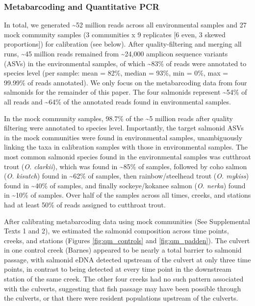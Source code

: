 \documentclass[
]{article}
\begin{document}
\hypertarget{metabarcoding-and-quantitative-pcr}{%
\subsubsection{Metabarcoding and Quantitative
PCR}\label{metabarcoding-and-quantitative-pcr}}

In total, we generated \textasciitilde52 million reads across all
environmental samples and 27 mock community samples (3 communities x 9
replicates {[}6 even, 3 skewed proportions{]}) for calibration (see
below). After quality-filtering and merging all runs, \textasciitilde45
million reads remained from \textasciitilde24,000 amplicon sequence
variants (ASVs) in the environmental samples, of which
\textasciitilde83\% of reads were annotated to species level (per
sample: mean = 82\%, median = 93\%, min = 0\%, max = 99.99\% of reads
annotated). We only focus on the metabarcoding data from four salmonids
for the remainder of this paper. The four salmonids represent
\textasciitilde54\% of all reads and \textasciitilde64\% of the
annotated reads found in environmental samples.

In the mock community samples, 98.7\% of the \textasciitilde5 million
reads after quality filtering were annotated to species level.
Importantly, the target salmonid ASVs in the mock communities were found
in environmental samples, unambiguously linking the taxa in calibration
samples with those in environmental samples. The most common salmonid
species found in the environmental samples was cutthroat trout (\emph{O.
clarkii}), which was found in \textasciitilde85\% of samples, followed
by coho salmon (\emph{O. kisutch}) found in \textasciitilde62\% of
samples, then rainbow/steelhead trout (\emph{O. mykiss}) found in
\textasciitilde40\% of samples, and finally sockeye/kokanee salmon
(\emph{O. nerka}) found in \textasciitilde10\% of samples. Over half of
the samples across all times, creeks, and stations had at least 50\% of
reads assigned to cutthroat trout.

After calibrating metabarcoding data using mock communities (See
Supplemental Texts 1 and 2), we estimated the salmonid composition
across time points, creeks, and stations (Figures \ref{fig:qm_controls}
and \ref{fig:qm_padden}). The culvert in one control creek (Barnes)
appeared to be nearly a total barrier to salmonid passage, with salmonid
eDNA detected upstream of the culvert at only three time points, in
contrast to being detected at every time point in the downstream station
of the same creek. The other four creeks had no such pattern associated
with the culverts, suggesting that fish passage may have been possible
through the culverts, or that there were resident populations upstream
of the culverts.
\end{document}
